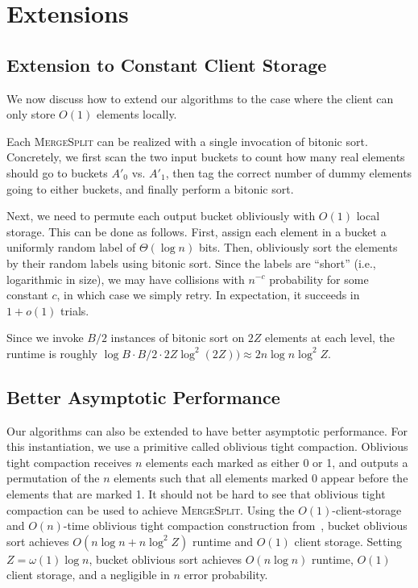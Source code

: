 
\section{Extensions}
\label{sec:extensions}

\subsection{Extension to Constant Client Storage}
\label{sec:O1client}
We now discuss how to extend our algorithms to the case where the client can only store $O(1)$ elements locally.

Each \textsc{MergeSplit} can be realized with a single invocation of bitonic sort.
Concretely, we first scan the two input buckets to count how many real elements should go to buckets $A'_0$ vs. $A'_1$, then tag the correct number of dummy elements going to either buckets, and finally perform a bitonic sort.

Next, we need to permute each output bucket obliviously with $O(1)$ local storage. 
This can be done as follows. 
First, assign each element in a bucket a uniformly random label of $\Theta(\log n)$ bits. 
Then, obliviously sort the elements by their random labels using bitonic sort. 
Since the labels are ``short'' (i.e., logarithmic in size), we may have collisions with $n^{-c}$ probability for some constant $c$, in which case we simply retry. 
In expectation, it succeeds in $1+o(1)$ trials. 


Since we invoke $B/2$ instances of bitonic sort on $2Z$ elements at each level,
the runtime is roughly $\log B \cdot B/2 \cdot 2Z \log^2 (2Z)) \approx 2 n\log n \log^2 Z$. 

\subsection{Better Asymptotic Performance}
Our algorithms can also be extended to have better asymptotic performance.
For this instantiation, we use a primitive called oblivious tight compaction.
Oblivious tight compaction receives $n$ elements each marked as either 0 or 1, and outputs a permutation of the $n$ elements such that all elements marked 0 appear before the elements that are marked 1. 
It should not be hard to see that oblivious tight compaction can be used to achieve \textsc{MergeSplit}.
Using the $O(1)$-client-storage and $O(n)$-time oblivious tight compaction construction from~\cite{asharov2018optorama}, bucket oblivious sort achieves $O(n\log n + n\log^2Z)$ runtime and $O(1)$ client storage.
Setting $Z=\omega(1)\log n$, bucket oblivious sort achieves $O(n\log n)$ runtime, $O(1)$ client storage, and a negligible in $n$ error probability.

